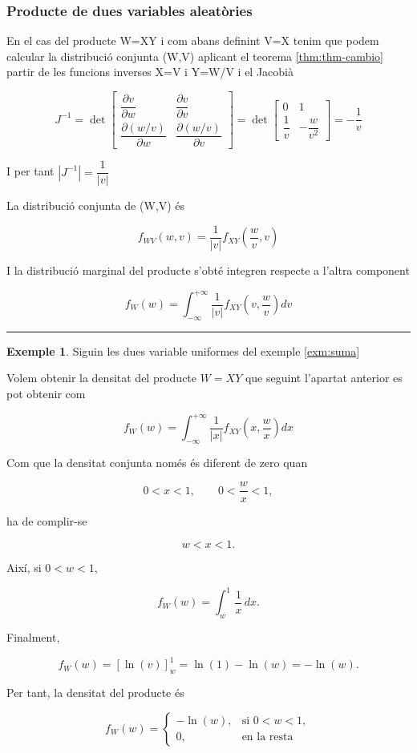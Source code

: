 \documentclass[
  catalan,
]{article}
\theoremstyle{definition}
\theoremstyle{definition}
\newtheorem{example}{Exemple}[section]
\theoremstyle{definition}
\theoremstyle{definition}
\theoremstyle{remark}
\begin{document}
\subsubsection{Producte de dues variables aleatòries}\label{producte-de-dues-variables-aleatuxf2ries}

En el cas del producte W=XY i com abans definint V=X tenim que podem calcular la distribució conjunta (W,V) aplicant el teorema \ref{thm:thm-cambio} partir de les funcions inverses X=V i Y=W/V i el Jacobià

\[
J^{-1}= 
\det
\begin{bmatrix}
\dfrac{\partial v}{\partial w} &
\dfrac{\partial v}{\partial v} \\[1ex]
\dfrac{\partial (w/v)}{\partial w} &
\dfrac{\partial (w/v)}{\partial v}
\end{bmatrix} =
\det
\begin{bmatrix}
0 & 1 \\[1ex]
\dfrac{1}{v} & -\dfrac{w}{v^2}
\end{bmatrix} 
=-\dfrac{1}{v}
\]

I per tant \(|J^{-1}|=\dfrac{1}{|v|}\)

La distribució conjunta de (W,V) és

\[
f_{WV}(w,v)=  \dfrac{1}{|v|} f_{XY} (\dfrac{w}{v},v)
\]

I la distribució marginal del producte s'obté integren respecte a l'altra component

\[
f_{W}(w)= \int_{- \infty}^{+ \infty} \dfrac{1}{|v|}f_{XY}(v,\dfrac{w}{v})dv
\]

\begin{center}\rule{0.5\linewidth}{0.5pt}\end{center}

\begin{example}
Siguin les dues variable uniformes del exemple \ref{exm:suma}

Volem obtenir la densitat del producte \(W=XY\) que seguint l'apartat anterior es pot obtenir com

\[
f_{W}(w)= \int_{- \infty}^{+ \infty} \dfrac{1}{|x|}f_{XY}(x,\dfrac{w}{x})dx
\]

Com que la densitat conjunta només és diferent de zero quan

\[
0<x<1,\qquad
0<\frac{w}{x}<1,
\]

ha de complir-se

\[
w<x<1.
\]

Així, si \(0<w<1\),

\[
f_W(w)=\int_w^1\frac{1}{x}\,dx.
\]

Finalment,

\[
f_W(w)=\left[\ln(v)\right]_w^1=\ln(1)-\ln(w)=-\ln(w).
\]

Per tant, la densitat del producte és

\[
f_W(w)=
\begin{cases}
-\ln(w), & \text{si } 0<w<1,\\
0, & \text{en la resta}
\end{cases}
\]
\end{example}
\end{document}
